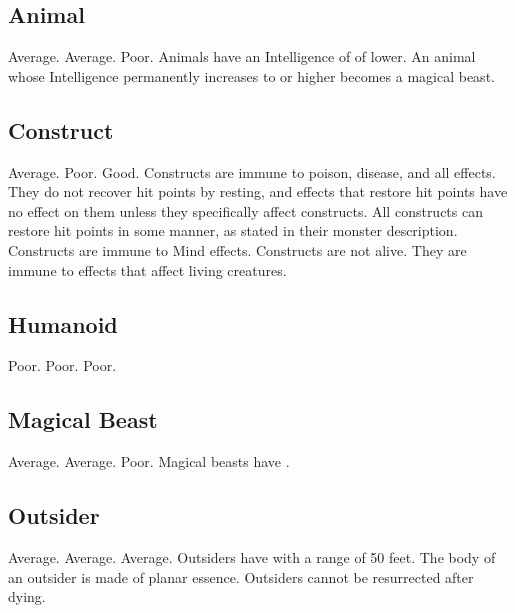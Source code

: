     \subsection{Animal}
         Average.
         Average.
         Poor.
         Animals have an Intelligence of  of lower.
        An animal whose Intelligence permanently increases to  or higher becomes a magical beast.

    \subsection{Construct}
         Average.
         Poor.
         Good.
         Constructs are immune to poison, disease, and all  effects.
        They do not recover hit points by resting, and effects that restore hit points have no effect on them unless they specifically affect constructs.
        All constructs can restore hit points in some manner, as stated in their monster description.
         Constructs are immune to Mind effects.
         Constructs are not alive.
        They are immune to effects that affect living creatures.

    \subsection{Humanoid}
         Poor.
         Poor.
         Poor.

    \subsection{Magical Beast}
         Average.
         Average.
         Poor.
         Magical beasts have .

    \subsection{Outsider}
         Average.
         Average.
         Average.
         Outsiders have  with a range of 50 feet.
         The body of an outsider is made of planar essence.
        Outsiders cannot be resurrected after dying.

